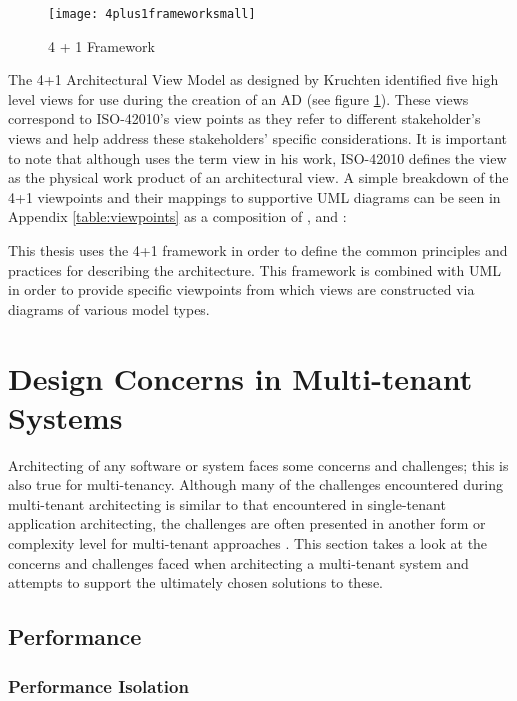 \begin{figure}
\centering
\texttt{[image: 4plus1frameworksmall]}
\caption{4 + 1 Framework}
\label{fig:4plus1frameworksmall}
\end{figure}

The 4+1 Architectural View Model as designed by Kruchten \cite{Kruchten} identified five high level views for use during the creation of an AD (see figure \ref{fig:4plus1frameworksmall}). These views correspond to ISO-42010's view points as they refer to different stakeholder's views and help address these stakeholders' specific considerations. It is important to note that although \cite{Kruchten} uses the term view in his work, ISO-42010 defines the view as the physical work product of an architectural view. A simple breakdown of the 4+1 viewpoints and their mappings to supportive UML diagrams can be seen in Appendix \ref{table:viewpoints} as a composition of \cite{Wiki4plus1}, \cite{Muchandi2007} and \cite{Kruchten}:


This thesis uses the 4+1 framework in order to define the common principles and practices for describing the architecture. This framework is combined with UML in order to provide specific viewpoints from which views are constructed via diagrams of various model types.



\section{Design Concerns in Multi-tenant Systems}
Architecting of any software or system faces some concerns and challenges; this is also true for multi-tenancy. Although many of the challenges encountered during multi-tenant architecting is similar to that encountered in single-tenant application architecting, the challenges are often presented in another form or complexity level for multi-tenant approaches \cite{Bezemer:2010:MSA:1862372.1862393}. This section takes a look at the concerns and challenges faced when architecting a multi-tenant system and attempts to support the ultimately chosen solutions to these.

\subsection{Performance}
\label{sec:performance}
\subsubsection{Performance Isolation}

